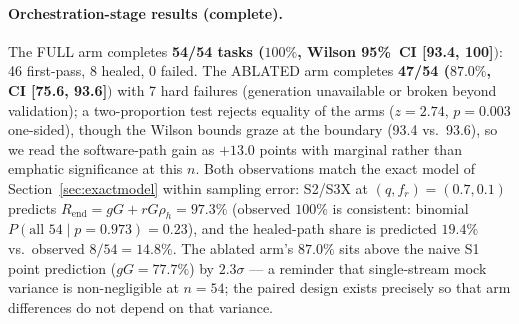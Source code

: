 ﻿\documentclass[12pt,a4paper]{article}
\begin{document}
\paragraph{Orchestration-stage results (complete).} The FULL arm completes \textbf{54/54 tasks ($100\%$, Wilson 95\%~CI [93.4, 100]$)$}: 46 first-pass, 8 healed, 0 failed. The ABLATED arm completes \textbf{47/54 ($87.0\%$, CI [75.6, 93.6]$)$} with 7 hard failures (generation unavailable or broken beyond validation); a two-proportion test rejects equality of the arms ($z = 2.74$, $p = 0.003$ one-sided), though the Wilson bounds graze at the boundary (93.4 vs.\ 93.6), so we read the software-path gain as $+13.0$ points with marginal rather than emphatic significance at this $n$. Both observations match the exact model of Section~\ref{sec:exactmodel} within sampling error: S2/S3X at $(q, f_r) = (0.7, 0.1)$ predicts $R_{\mathrm{end}} = gG + rG\rho_h = 97.3\%$ (observed $100\%$ is consistent: binomial $P(\text{all } 54 \mid p{=}0.973) = 0.23$), and the healed-path share is predicted $19.4\%$ vs.\ observed $8/54 = 14.8\%$. The ablated arm's $87.0\%$ sits above the naive S1 point prediction ($gG = 77.7\%$) by $2.3\sigma$ --- a reminder that single-stream mock variance is non-negligible at $n{=}54$; the paired design exists precisely so that arm differences do not depend on that variance.
\end{document}
